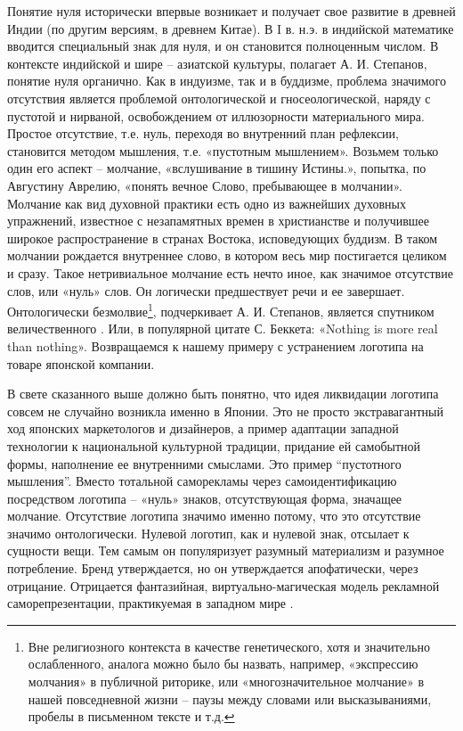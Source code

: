 Понятие нуля исторически впервые возникает и получает свое развитие в древней Индии (по другим версиям, в древнем Китае). В I в. н.э. в индийской математике вводится специальный знак для нуля, и он становится полноценным числом\autocite[][351]{stepanov2004}.  В контексте индийской и шире -- азиатской культуры, полагает А. И. Степанов, понятие нуля органично. Как в индуизме, так и в буддизме, проблема значимого отсутствия является проблемой онтологической и гносеологической, наряду с пустотой и нирваной, освобождением от иллюзорности материального мира. Простое отсутствие, т.е. нуль, переходя во внутренний план рефлексии, становится методом мышления, т.е. «пустотным мышлением»\autocite[][352]{stepanov2004}. Возьмем только один его аспект -- молчание, «вслушивание в тишину Истины.», попытка, по Августину Аврелию, «понять вечное Слово, пребывающее в молчании»\autocite[][ХI, 6, 8]{avgustin1992}. Молчание как вид духовной практики есть одно из важнейших духовных упражнений, известное с незапамятных времен в христианстве и получившее широкое распространение в странах Востока, исповедующих буддизм. В таком молчании рождается внутреннее слово, в котором весь мир постигается  целиком и сразу\autocite[][112-125]{nestik1998}. Такое нетривиальное молчание есть нечто иное, как значимое отсутствие слов, или «нуль» слов. Он логически предшествует речи и ее завершает. Онтологически безмолвие\footnote{Вне религиозного контекста  в качестве генетического, хотя и значительно ослабленного,  аналога можно было бы назвать, например,  «экспрессию молчания» в публичной риторике,  или «многозначительное молчание» в нашей повседневной жизни – паузы между словами или высказываниями, пробелы в письменном тексте и т.д.}, подчеркивает А. И. Степанов, является спутником величественного \autocite[][358]{stepanov2004}. Или, в популярной цитате С. Беккета: «Nothing is more real than nothing»\autocite[][63]{esslin2004}. Возвращаемся к нашему примеру с устранением логотипа на товаре японской компании.

В свете сказанного выше должно быть понятно, что идея ликвидации логотипа совсем не случайно возникла именно в Японии. Это не просто экстравагантный ход японских маркетологов и дизайнеров, а пример адаптации западной технологии к национальной культурной традиции, придание ей самобытной формы, наполнение ее внутренними смыслами. Это пример “пустотного мышления”. Вместо тотальной саморекламы через самоидентификацию посредством логотипа -- «нуль» знаков, отсутствующая форма, значащее молчание.  Отсутствие логотипа значимо именно потому, что это отсутствие значимо онтологически. Нулевой логотип, как и нулевой знак, отсылает к сущности вещи. Тем самым он  популяризует  разумный материализм и разумное потребление.  Бренд утверждается, но он утверждается апофатически, через отрицание. Отрицается фантазийная, виртуально-магическая модель рекламной саморепрезентации, практикуемая в западном мире \autocite[][410-423]{williams1999}.

